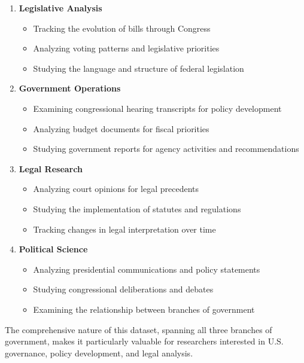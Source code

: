 \begin{enumerate}
    \item \textbf{Legislative Analysis}
    \begin{itemize}
        \item Tracking the evolution of bills through Congress
        \item Analyzing voting patterns and legislative priorities
        \item Studying the language and structure of federal legislation
    \end{itemize}
    
    \item \textbf{Government Operations}
    \begin{itemize}
        \item Examining congressional hearing transcripts for policy development
        \item Analyzing budget documents for fiscal priorities
        \item Studying government reports for agency activities and recommendations
    \end{itemize}
    
    \item \textbf{Legal Research}
    \begin{itemize}
        \item Analyzing court opinions for legal precedents
        \item Studying the implementation of statutes and regulations
        \item Tracking changes in legal interpretation over time
    \end{itemize}
    
    \item \textbf{Political Science}
    \begin{itemize}
        \item Analyzing presidential communications and policy statements
        \item Studying congressional deliberations and debates
        \item Examining the relationship between branches of government
    \end{itemize}
\end{enumerate}

The comprehensive nature of this dataset, spanning all three branches of government, makes it particularly valuable for researchers interested in U.S. governance, policy development, and legal analysis.